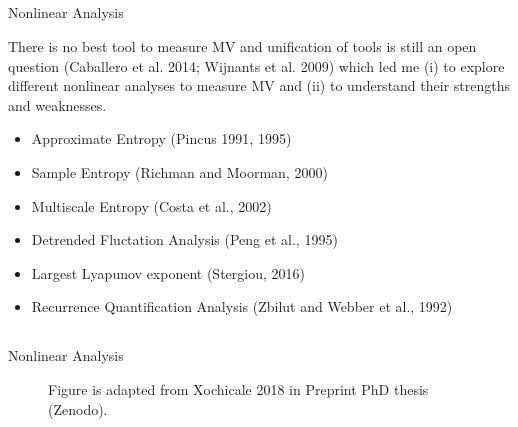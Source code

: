 \subsection{}
{
{
\begin{frame}{Nonlinear Analysis}


There is no best tool to measure MV and unification of tools is still
an open question (Caballero et al. 2014; Wijnants et al. 2009)
which led me (i) to explore different nonlinear analyses 
to measure MV and (ii) to understand their strengths and weaknesses. 

\begin{itemize}
	\item Approximate Entropy (Pincus 1991, 1995)
	\item Sample Entropy (Richman and Moorman, 2000)
	\item Multiscale Entropy (Costa et al., 2002)
	\item Detrended Fluctation Analysis (Peng et al., 1995)
	\item Largest Lyapunov exponent (Stergiou, 2016)
	\item Recurrence Quantification Analysis (Zbilut and Webber et al., 1992)

\end{itemize}


\end{frame}
}



\subsection{}
{

\begin{frame}{Nonlinear Analysis}
    \begin{figure}
	{Figure is adapted from Xochicale 2018 in Preprint PhD thesis (Zenodo).} 
   \end{figure}
	

\end{frame}}}
